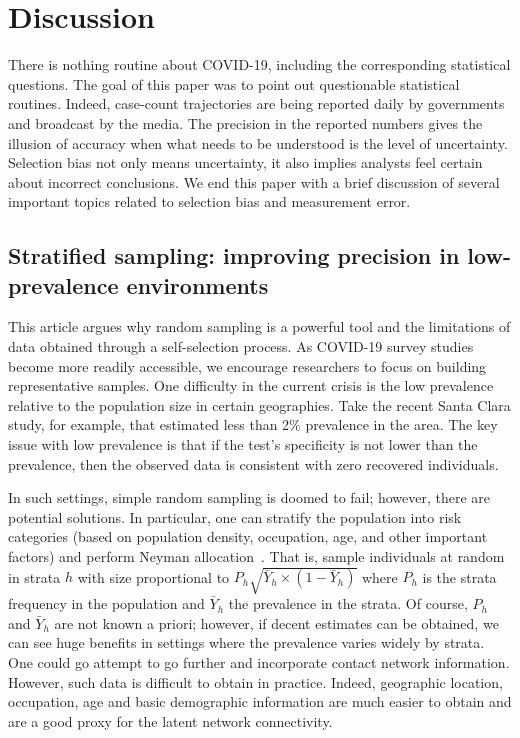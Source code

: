 \documentclass[12pt]{article}
\begin{document}
\section*{Discussion}
\label{section:discussion}

There is nothing routine about COVID-19, including the corresponding statistical questions.  The goal of this paper was to point out questionable statistical routines.  Indeed, case-count trajectories are being reported daily by governments and broadcast by the media.  The precision in the reported numbers gives the illusion of accuracy when what needs to be understood is the level of uncertainty. Selection bias not only means uncertainty, it also implies analysts feel certain about incorrect conclusions.  We end this paper with a brief discussion of several important topics related to selection bias and measurement error.

\subsection*{Stratified sampling: improving precision in low-prevalence environments}

This article argues why random sampling is a powerful tool and the limitations of data obtained through a self-selection process.  As COVID-19 survey studies become more readily accessible, we encourage researchers to focus on building representative samples.  One difficulty in the current crisis is the low prevalence relative to the population size in certain geographies.  Take the recent Santa Clara study, for example, that estimated less than 2\% prevalence in the area.  The key issue with low prevalence is that if the test's specificity is not lower than the prevalence, then the observed data is consistent with zero recovered individuals.

In such settings, simple random sampling is doomed to fail; however, there are potential solutions.  In particular, one can stratify the population into risk categories (based on population density, occupation, age, and other important factors) and perform Neyman allocation~\cite{Cochran77}.  That is, sample individuals at random in strata $h$ with size proportional to $P_h \sqrt{\bar Y_h \times (1-\bar Y_h)}$ where $P_h$ is the strata frequency in the population and $\bar Y_h$ the prevalence in the strata. Of course, $P_h$ and $\bar Y_h$ are not known a priori; however, if decent estimates can be obtained, we can see huge benefits in settings where the prevalence varies widely by strata. One could go attempt to go further and incorporate contact network information.  However, such data is difficult to obtain in practice.  Indeed, geographic location, occupation, age and basic demographic information are much easier to obtain and are a good proxy for the latent network connectivity.
\end{document}
